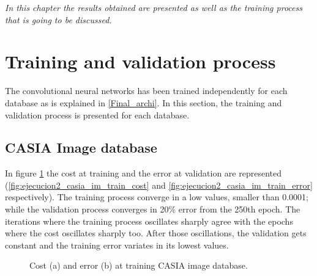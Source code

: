 \begin{small}
\emph{In this chapter the results obtained are presented as well as the training process that is going to be discussed.\\}
\end{small}

\section{Training and validation process}
The convolutional neural networks has been trained independently for each database as is explained in \ref{Final_archi}. In this section, the training and validation process is presented for each database.

\subsection{CASIA Image database}
In figure \ref{fig:ejecucion2_casia_im_train} the cost at training and the error at validation are represented (\ref{fig:ejecucion2_casia_im_train_cost} and \ref{fig:ejecucion2_casia_im_train_error} respectively). The training process converge in a low values, smaller than 0.0001; while the validation process converges in 20\% error from the 250th epoch. The iterations where the training process oscillates sharply agree with the epochs where the cost oscillates sharply too. After those oscillations, the validation gets constant and the training error variates in its lowest values.\\
\begin{figure}[htb]
\centering
\caption{Cost (a) and error (b) at training CASIA image database.}
\label{fig:ejecucion2_casia_im_train}
\end{figure}

